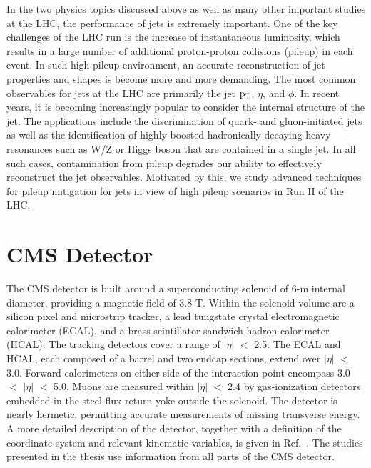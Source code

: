 In the two physics topics discussed above as well as many other important studies at the LHC, the performance of jets is extremely important.
 One of the key challenges of the  LHC run is the increase of instantaneous luminosity, which results in a large number of additional proton-proton collisions (pileup) in each event. In such high pileup environment, an accurate reconstruction of jet properties and shapes is become more and more demanding. The most common observables for jets at the LHC  are primarily the jet $\rm p_{T}$, $\eta$, and $\phi$.
In recent years, it is becoming increasingly popular to consider the internal structure of the jet. The applications include the discrimination of quark- and gluon-initiated jets as well as the identification of highly boosted hadronically decaying heavy resonances such as W/Z or Higgs boson that are contained in a single jet.  
In all such cases, contamination from pileup degrades our ability to effectively reconstruct the jet observables.  
Motivated by this, we study advanced techniques for pileup mitigation for jets in view of high pileup scenarios in Run II of the LHC.





\section{CMS Detector }
The CMS detector is built around a superconducting solenoid of 6-m internal diameter, providing
a magnetic field of 3.8 T. Within the solenoid volume are a silicon pixel and microstrip tracker, a
lead tungstate crystal electromagnetic calorimeter (ECAL), and a brass-scintillator sandwich hadron
calorimeter (HCAL). The tracking detectors cover a range of  $|\eta|$ $<$  2.5. The ECAL and HCAL, each composed of a barrel and two endcap sections, extend over  $|\eta|$ $<$ 3.0. Forward calorimeters on either side of the
interaction point encompass 3.0 $<$  $|\eta|$ $<$ 5.0. Muons
are measured within $|\eta|$ $<$ 2.4 by gas-ionization detectors embedded in the steel flux-return
yoke outside the solenoid. The detector is nearly hermetic, permitting accurate measurements
of missing transverse energy. A more detailed description of the detector, together with a definition of the
coordinate system and relevant kinematic variables, is given in Ref.~\cite{cms}. The studies presented in the thesis use information from all parts of the CMS detector.

